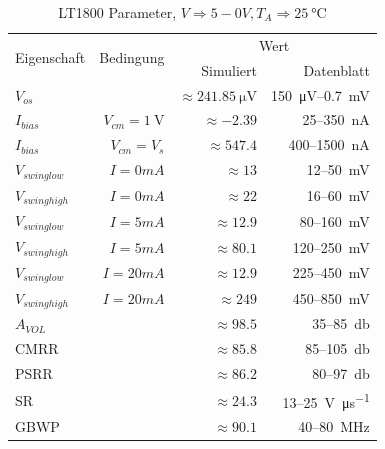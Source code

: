 \documentclass[
	ngerman,
	parskip=half,
	headsepline,
	twocolumn,
	DIV=calc,
	listof=leveldown,
	]{scrartcl}
\begin{document}
	\begin{table}[h!]
		\centering
		\begin{tabular}{l r r r}
			\toprule
			\multirow{2}{*}{Eigenschaft} & \multirow{2}{*}{Bedingung} &
			\multicolumn{2}{c}{Wert} \\
			&& Simuliert & Datenblatt \cite{datasheet:LT1800} \\
			\midrule		
			
			$V_{os}$											  			     && $ \approx  \SI{241.85}{\micro\volt} $ & \SI{150}{\micro\volt}--\SI{0.7}{\milli\volt} \\			
			$I_{bias}$					          &$V_{cm} = \SI{1}{\volt}$ & $\approx -2.39$         & 25--\SI{350}{\nano\ampere} \\			
			$I_{bias}$ 					  		 & $V_{cm} = V_{s}$	   & $\approx 547.4$         & 400--\SI{1500}{\nano\ampere} \\		
			$V_{swing low}	 $		 & $I = 0mA$& $ \approx 13 $ 			& 12--\SI{50}{\milli\volt}  \\ 
			$V_{swing high} $		 &	$ I = 0mA$& $ \approx 22 $    		& 16--\SI{60}{\milli\volt} \\
			$V_{swing low}  $		 &$ I = 5mA$	& $  \approx 12.9$   & 80--\SI{160}{\milli\volt}    \\ 
			$V_{swing high}$		 & $I = 5mA$ & $ \approx   80.1$   & 120--\SI{250}{\milli\volt}   \\
		    $V_{swing low}$		& $I = 20mA$ & $  \approx  12.9 $   & 225--\SI{450}{\milli\volt}    \\ 
			$V_{swing high}$		& $ I = 20mA$ & $ \approx   249 $   & 450--\SI{850}{\milli\volt}  \\
		    $A_{VOL}$					&									  & $\approx 98.5 $				& 35--\SI{85}{\decibel} \\
			CMRR 							&									   & $\approx 85.8$ 		  & 85--\SI{105}{\decibel}\\
			PSRR 							&										& $\approx 86.2$ 			& 80--\SI{97}{\decibel} \\
			SR 									&									  & $ \approx 24.3 $ 		& 13--\SI{25}{\volt\per\micro\second}\\
			GBWP 							&									  & $\approx 90.1$ 				& 40--\SI{80}{\mega\hertz}\\
			\bottomrule
		\end{tabular}
		\caption[LT1800 Parameter]{LT1800 Parameter, $V \Rightarrow 5-0V, T_A \Rightarrow  \SI{25}{\celsius}  $}
		\label{tab:opamp-LT1800}
	\end{table}
\end{document}
